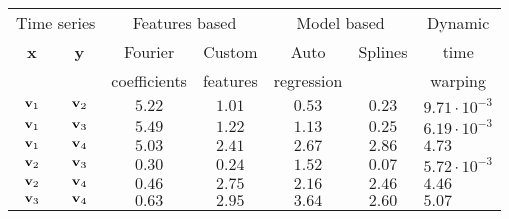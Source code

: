\begin{tabular}{ccccccl}
    \toprule
    \multicolumn{2}{c}{Time series} & \multicolumn{2}{c}{Features based} & \multicolumn{2}{c}{Model based} & \multicolumn{1}{c}{Dynamic} \\
    \textbf{x} & \textbf{y} & Fourier & Custom & Auto & Splines & \multicolumn{1}{c}{time} \\
    & & coefficients & features & regression & & \multicolumn{1}{c}{warping} \\
 \otoprule
    $\textbf{v}_{1}$ & $\textbf{v}_{2}$ & $5.22$ & $1.01$ & $0.53$ & $0.23$ & $9.71 \cdot 10^{-3}$ \\
    $\textbf{v}_{1}$ & $\textbf{v}_{3}$ & $5.49$ & $1.22$ & $1.13$ & $0.25$ & $6.19 \cdot 10^{-3}$ \\
    $\textbf{v}_{1}$ & $\textbf{v}_{4}$ & $5.03$ & $2.41$ & $2.67$ & $2.86$ & $4.73$ \\
    $\textbf{v}_{2}$ & $\textbf{v}_{3}$ & $0.30$ & $0.24$ & $1.52$ & $0.07$ & $5.72 \cdot 10^{-3}$ \\
    $\textbf{v}_{2}$ & $\textbf{v}_{4}$ & $0.46$ & $2.75$ & $2.16$ & $2.46$ & $4.46$ \\
    $\textbf{v}_{3}$ & $\textbf{v}_{4}$ & $0.63$ & $2.95$ & $3.64$ & $2.60$ & $5.07$ \\
    \bottomrule
\end{tabular}
